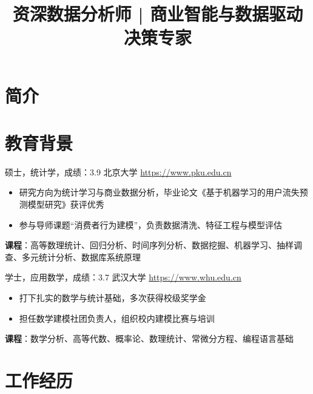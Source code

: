\documentclass[a4paper, serif, 10pt]{moderncv}
\title{资深数据分析师 | 商业智能与数据驱动决策专家}
\begin{document}
\maketitle

\section{简介}

\section{教育背景}

        {硕士，统计学，成绩：3.9}
        {北京大学}
        {\url{https://www.pku.edu.cn}}
        {}
        {\begin{itemize}
\item 研究方向为统计学习与商业数据分析，毕业论文《基于机器学习的用户流失预测模型研究》获评优秀
\item 参与导师课题“消费者行为建模”，负责数据清洗、特征工程与模型评估
\end{itemize}
\textbf{课程}：高等数理统计、回归分析、时间序列分析、数据挖掘、机器学习、抽样调查、多元统计分析、数据库系统原理}

        {学士，应用数学，成绩：3.7}
        {武汉大学}
        {\url{https://www.whu.edu.cn}}
        {}
        {\begin{itemize}
\item 打下扎实的数学与统计基础，多次获得校级奖学金
\item 担任数学建模社团负责人，组织校内建模比赛与培训
\end{itemize}
\textbf{课程}：数学分析、高等代数、概率论、数理统计、常微分方程、编程语言基础}
\section{工作经历}
\end{document}
